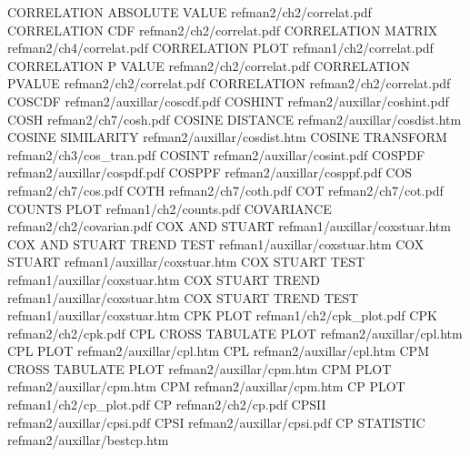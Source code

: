 CORRELATION ABSOLUTE VALUE              refman2/ch2/correlat.pdf
CORRELATION CDF                         refman2/ch2/correlat.pdf
CORRELATION MATRIX                      refman2/ch4/correlat.pdf
CORRELATION PLOT                        refman1/ch2/correlat.pdf
CORRELATION P VALUE                     refman2/ch2/correlat.pdf
CORRELATION PVALUE                      refman2/ch2/correlat.pdf
CORRELATION                             refman2/ch2/correlat.pdf
COSCDF                                  refman2/auxillar/coscdf.pdf
COSHINT                                 refman2/auxillar/coshint.pdf
COSH                                    refman2/ch7/cosh.pdf
COSINE DISTANCE                         refman2/auxillar/cosdist.htm
COSINE SIMILARITY                       refman2/auxillar/cosdist.htm
COSINE TRANSFORM                        refman2/ch3/cos_tran.pdf
COSINT                                  refman2/auxillar/cosint.pdf
COSPDF                                  refman2/auxillar/cospdf.pdf
COSPPF                                  refman2/auxillar/cosppf.pdf
COS                                     refman2/ch7/cos.pdf
COTH                                    refman2/ch7/coth.pdf
COT                                     refman2/ch7/cot.pdf
COUNTS PLOT                             refman1/ch2/counts.pdf
COVARIANCE                              refman2/ch2/covarian.pdf
COX AND STUART                          refman1/auxillar/coxstuar.htm
COX AND STUART TREND TEST               refman1/auxillar/coxstuar.htm
COX STUART                              refman1/auxillar/coxstuar.htm
COX STUART TEST                         refman1/auxillar/coxstuar.htm
COX STUART TREND                        refman1/auxillar/coxstuar.htm
COX STUART TREND TEST                   refman1/auxillar/coxstuar.htm
CPK PLOT                                refman1/ch2/cpk_plot.pdf
CPK                                     refman2/ch2/cpk.pdf
CPL CROSS TABULATE PLOT                 refman2/auxillar/cpl.htm
CPL PLOT                                refman2/auxillar/cpl.htm
CPL                                     refman2/auxillar/cpl.htm
CPM CROSS TABULATE PLOT                 refman2/auxillar/cpm.htm
CPM PLOT                                refman2/auxillar/cpm.htm
CPM                                     refman2/auxillar/cpm.htm
CP PLOT                                 refman1/ch2/cp_plot.pdf
CP                                      refman2/ch2/cp.pdf
CPSII                                   refman2/auxillar/cpsi.pdf
CPSI                                    refman2/auxillar/cpsi.pdf
CP STATISTIC                            refman2/auxillar/bestcp.htm
